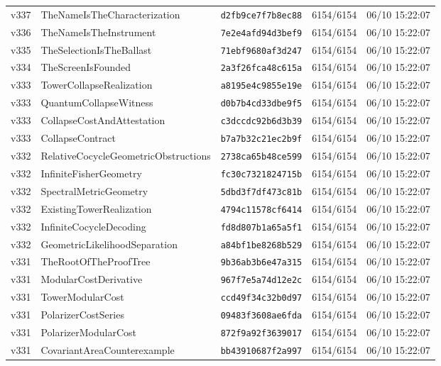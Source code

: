 \documentclass[11pt]{article}
\theoremstyle{definition}\newtheorem{deriv}{Derivation}
\begin{document}
{\begin{longtable}{@{}lllll@{}}
v337 & TheNameIsTheCharacterization & \texttt{d2fb9ce7f7b8ec88} & 6154/6154 & 06/10 15:22:07 \\
v336 & TheNameIsTheInstrument & \texttt{7e2e4afd94d3bef9} & 6154/6154 & 06/10 15:22:07 \\
v335 & TheSelectionIsTheBallast & \texttt{71ebf9680af3d247} & 6154/6154 & 06/10 15:22:07 \\
v334 & TheScreenIsFounded & \texttt{2a3f26fca48c615a} & 6154/6154 & 06/10 15:22:07 \\
v333 & TowerCollapseRealization & \texttt{a8195e4c9855e19e} & 6154/6154 & 06/10 15:22:07 \\
v333 & QuantumCollapseWitness & \texttt{d0b7b4cd33dbe9f5} & 6154/6154 & 06/10 15:22:07 \\
v333 & CollapseCostAndAttestation & \texttt{c3dccdc92b6d3b39} & 6154/6154 & 06/10 15:22:07 \\
v333 & CollapseContract & \texttt{b7a7b32c21ec2b9f} & 6154/6154 & 06/10 15:22:07 \\
v332 & RelativeCocycleGeometricObstructions & \texttt{2738ca65b48ce599} & 6154/6154 & 06/10 15:22:07 \\
v332 & InfiniteFisherGeometry & \texttt{fc30c7321824715b} & 6154/6154 & 06/10 15:22:07 \\
v332 & SpectralMetricGeometry & \texttt{5dbd3f7df473c81b} & 6154/6154 & 06/10 15:22:07 \\
v332 & ExistingTowerRealization & \texttt{4794c11578cf6414} & 6154/6154 & 06/10 15:22:07 \\
v332 & InfiniteCocycleDecoding & \texttt{fd8d807b1a65a5f1} & 6154/6154 & 06/10 15:22:07 \\
v332 & GeometricLikelihoodSeparation & \texttt{a84bf1be8268b529} & 6154/6154 & 06/10 15:22:07 \\
v331 & TheRootOfTheProofTree & \texttt{9b36ab3b6e47a315} & 6154/6154 & 06/10 15:22:07 \\
v331 & ModularCostDerivative & \texttt{967f7e5a74d12e2c} & 6154/6154 & 06/10 15:22:07 \\
v331 & TowerModularCost & \texttt{ccd49f34c32b0d97} & 6154/6154 & 06/10 15:22:07 \\
v331 & PolarizerCostSeries & \texttt{09483f3608ae6fda} & 6154/6154 & 06/10 15:22:07 \\
v331 & PolarizerModularCost & \texttt{872f9a92f3639017} & 6154/6154 & 06/10 15:22:07 \\
v331 & CovariantAreaCounterexample & \texttt{bb43910687f2a997} & 6154/6154 & 06/10 15:22:07 \\

\end{longtable}}
\end{document}
